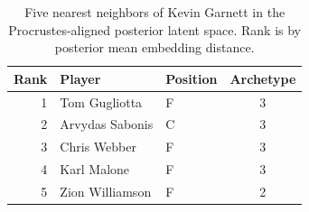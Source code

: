 \begin{table}[htbp]
  \centering\small
  \begin{tabular}{rllc}
    \toprule
    Rank & Player & Position & Archetype \\
    \midrule
    1 & Tom Gugliotta & F & 3 \\
    2 & Arvydas Sabonis & C & 3 \\
    3 & Chris Webber & F & 3 \\
    4 & Karl Malone & F & 3 \\
    5 & Zion Williamson & F & 2 \\
    \bottomrule
  \end{tabular}
  \caption{Five nearest neighbors of Kevin Garnett in the Procrustes-aligned posterior latent space. Rank is by posterior mean embedding distance.}
  \label{tab:Kevin_Garnett_neighbors}
\end{table}

